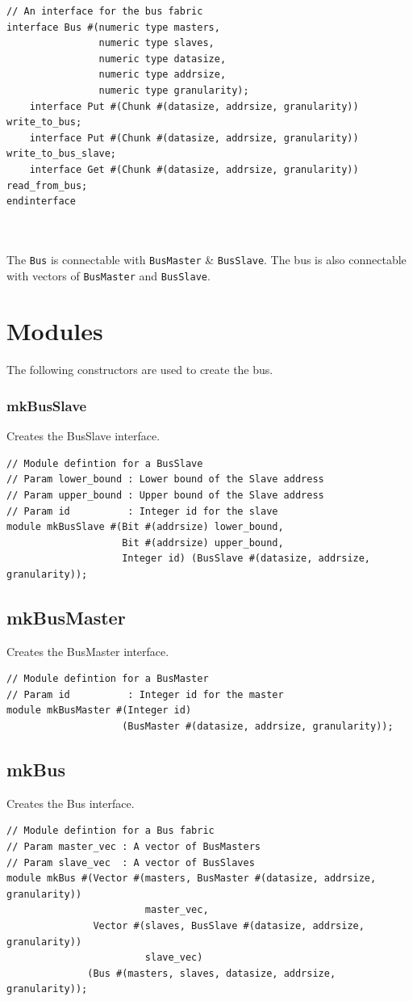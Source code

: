 \begin{paper}
\begin{verbatim}
// An interface for the bus fabric
interface Bus #(numeric type masters,
                numeric type slaves, 
                numeric type datasize, 
                numeric type addrsize, 
                numeric type granularity);
    interface Put #(Chunk #(datasize, addrsize, granularity)) write_to_bus;
    interface Put #(Chunk #(datasize, addrsize, granularity)) write_to_bus_slave;
    interface Get #(Chunk #(datasize, addrsize, granularity)) read_from_bus;
endinterface
\end{verbatim}\\\\
\nointend The \texttt{Bus} is connectable with \texttt{BusMaster} & \texttt{BusSlave}. The bus is also connectable with vectors of \texttt{BusMaster} and \texttt{BusSlave}.

\section*{Modules\sdot}
The following constructors are used to create the bus.
\subsubsection*{mkBusSlave\sdot}
Creates the BusSlave interface.
\begin{verbatim}
// Module defintion for a BusSlave
// Param lower_bound : Lower bound of the Slave address
// Param upper_bound : Upper bound of the Slave address
// Param id          : Integer id for the slave
module mkBusSlave #(Bit #(addrsize) lower_bound,
                    Bit #(addrsize) upper_bound,
                    Integer id) (BusSlave #(datasize, addrsize, granularity));
\end{verbatim}
\subsection*{mkBusMaster\sdot}
Creates the BusMaster interface.
\begin{verbatim}
// Module defintion for a BusMaster
// Param id          : Integer id for the master
module mkBusMaster #(Integer id) 
                    (BusMaster #(datasize, addrsize, granularity));
\end{verbatim}
\subsection*{mkBus\sdot}
Creates the Bus interface.
\begin{verbatim}
// Module defintion for a Bus fabric
// Param master_vec : A vector of BusMasters
// Param slave_vec  : A vector of BusSlaves
module mkBus #(Vector #(masters, BusMaster #(datasize, addrsize, granularity)) 
                        master_vec,
               Vector #(slaves, BusSlave #(datasize, addrsize, granularity)) 
                        slave_vec) 
              (Bus #(masters, slaves, datasize, addrsize, granularity));
\end{verbatim}
\end{paper}


